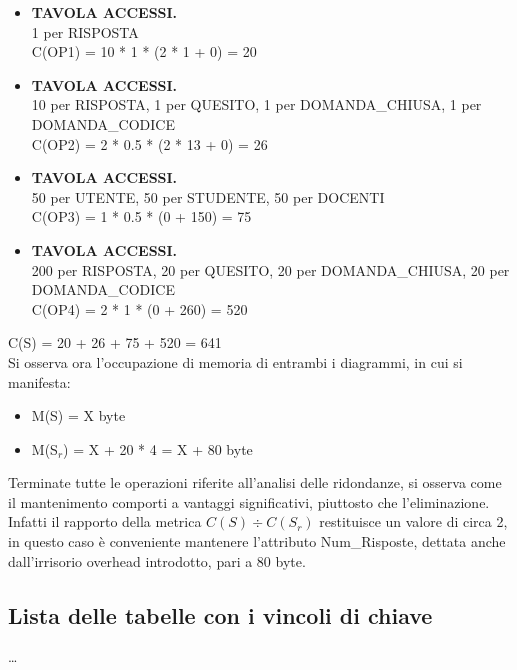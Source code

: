\documentclass{article}
\begin{document}
\begin{itemize}[label={-}]
    \itemsep0em 
    \item {\small\textbf{TAVOLA ACCESSI.} \\ 1 per RISPOSTA} \vspace*{2pt}\\ C(OP1) = 10 * 1 * (2 * 1 + 0) = 20 \vspace*{2pt} 
    \item {\small\textbf{TAVOLA ACCESSI.} \\ 10 per RISPOSTA, 1 per QUESITO, 1 per DOMANDA\_CHIUSA, 1 per DOMANDA\_CODICE} \vspace*{2pt}\\ C(OP2) = 2 * 0.5 * (2 * 13 + 0) = 26 \vspace*{2pt}
    \item {\small\textbf{TAVOLA ACCESSI.} \\ 50 per UTENTE, 50 per STUDENTE, 50 per DOCENTI} \vspace*{2pt}\\ C(OP3) = 1 * 0.5 * (0 + 150) = 75
    \item {\small\textbf{TAVOLA ACCESSI.} \\ 200 per RISPOSTA, 20 per QUESITO, 20 per DOMANDA\_CHIUSA, 20 per DOMANDA\_CODICE} \vspace*{2pt}\\ C(OP4) = 2 * 1 * (0 + 260) = 520
\end{itemize}
\hspace*{15pt}C(S) = 20 + 26 + 75 + 520 = 641 \vspace*{7pt} \vspace*{7pt}\\
Si osserva ora l'occupazione di memoria di entrambi i diagrammi, in cui si manifesta:
\begin{itemize}[label={-}]
    \itemsep0em
    \item M(S) = \hspace*{1pt}X byte
    \item M(S$_r$) = X + 20 * 4 = X + 80 byte
\end{itemize}
Terminate tutte le operazioni riferite all'analisi delle ridondanze, si osserva come il mantenimento comporti a vantaggi significativi, piuttosto che l'eliminazione. Infatti il rapporto della metrica $C(S) \div C(S_r)$ restituisce un valore di circa 2, in questo caso è conveniente mantenere l'attributo Num\_Risposte, dettata anche dall'irrisorio overhead introdotto, pari a 80 byte.

\newpage
\subsection{Lista delle tabelle con i vincoli di chiave}
\large
\dots
\end{document}
